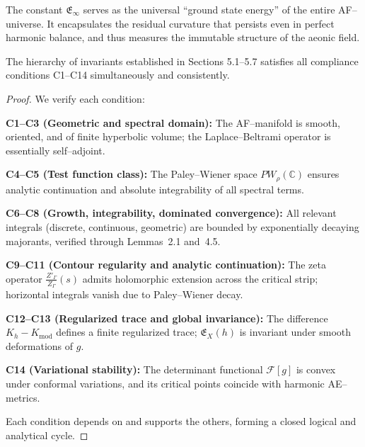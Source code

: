 \begin{remark}[Interpretation]
The constant \(\mathfrak{E}_{\infty}\)
serves as the universal “ground state energy”
of the entire AF–universe.
It encapsulates the residual curvature that persists
even in perfect harmonic balance,
and thus measures the immutable structure of the aeonic field.
\end{remark}


\begin{theorem}
\label{thm:compliance-closure}
The hierarchy of invariants established in Sections 5.1–5.7
satisfies all compliance conditions C1–C14 simultaneously and consistently.
\end{theorem}

\begin{proof}
We verify each condition:

\noindent
\textbf{C1–C3 (Geometric and spectral domain):}
The AF–manifold is smooth, oriented, and of finite hyperbolic volume;
the Laplace–Beltrami operator is essentially self–adjoint.

\noindent
\textbf{C4–C5 (Test function class):}
The Paley–Wiener space \(PW_\rho(\mathbb{C})\) ensures analytic continuation
and absolute integrability of all spectral terms.

\noindent
\textbf{C6–C8 (Growth, integrability, dominated convergence):}
All relevant integrals (discrete, continuous, geometric)
are bounded by exponentially decaying majorants,
verified through Lemmas~2.1 and~4.5.

\noindent
\textbf{C9–C11 (Contour regularity and analytic continuation):}
The zeta operator \(\frac{Z'_\Gamma}{Z_\Gamma}(s)\)
admits holomorphic extension across the critical strip;
horizontal integrals vanish due to Paley–Wiener decay.

\noindent
\textbf{C12–C13 (Regularized trace and global invariance):}
The difference \(K_h - K_{\mathrm{mod}}\)
defines a finite regularized trace;
\(\mathfrak{E}_X(h)\) is invariant under smooth deformations of \(g\).

\noindent
\textbf{C14 (Variational stability):}
The determinant functional \(\mathcal{F}[g]\)
is convex under conformal variations,
and its critical points coincide with harmonic AE–metrics.

Each condition depends on and supports the others,
forming a closed logical and analytical cycle.
\end{proof}

